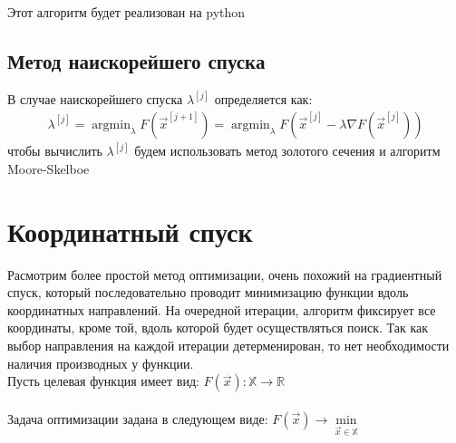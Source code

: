 \documentclass{article}
\begin{document}
    Этот алгоритм будет реализован на python

    \subsection{Метод наискорейшего спуска}
    В случае наискорейшего спуска $\lambda^{[j]}$ определяется как:\\
    \begin{gather*}
        \lambda^{[j]}=\operatorname{argmin}_\lambda F\left(\vec{x}^{[j+1]}\right)=\operatorname{argmin}_\lambda F\left(\vec{x}^{[j]}-\lambda \nabla F\left(\vec{x}^{[j]}\right)\right)
    \end{gather*}
    чтобы вычислить $\lambda^{[j]}$ будем использовать метод золотого сечения и алгоритм Moore-Skelboe










































    \newpage



    \newpage


    \section{Координатный спуск}

    Расмотрим более простой метод оптимизации, очень похожий на градиентный спуск, который последовательно проводит минимизацию функции вдоль координатных направлений. На очередной итерации, алгоритм фиксирует все координаты, кроме той, вдоль которой будет осуществляться поиск. Так как выбор направления на каждой итерации детерменирован, то нет необходимости наличия производных у функции.\\


    Пусть целевая функция имеет вид:
    $F(\vec{x}): \mathbb{X} \rightarrow \mathbb{R}$\\\\
    Задача оптимизации задана в следующем виде:
    $F(\vec{x}) \rightarrow    \underset{\vec{x} \in \mathbb{X}}{\min}$\\\\
\end{document}
